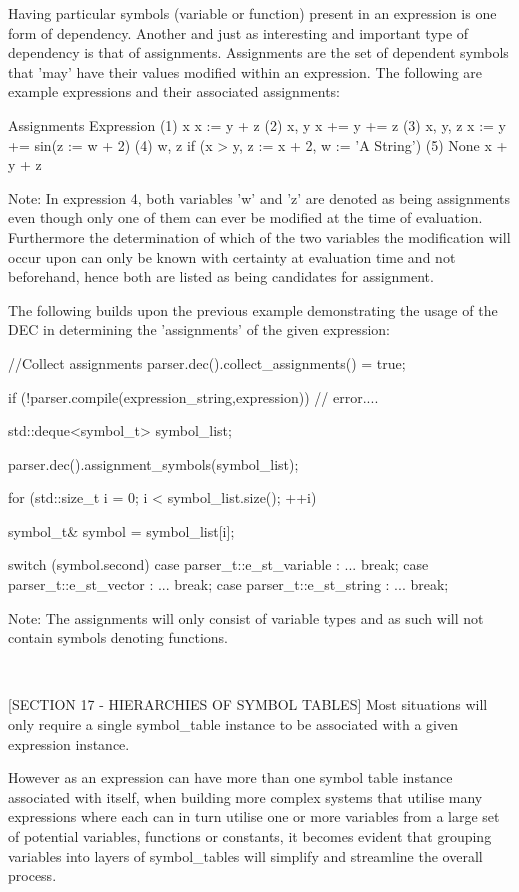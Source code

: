 Having  particular  symbols  (variable  or  function)  present  in  an
expression is one form of dependency. Another and just as  interesting
and important type of  dependency is that of  assignments. Assignments
are the set of dependent symbols that 'may' have their values modified
within an expression. The following are example expressions and  their
associated assignments:

Assignments   Expression
(1) x             x := y + z
(2) x, y          x += y += z
(3) x, y, z       x := y += sin(z := w + 2)
(4) w, z          if (x > y, z := x + 2, w := 'A String')
(5) None          x + y + z


Note: In expression 4, both variables 'w' and 'z' are denoted as being
assignments even though only one of  them can ever be modified at  the
time of evaluation. Furthermore the determination of which of the  two
variables the  modification will  occur upon  can only  be known  with
certainty at evaluation time and not beforehand, hence both are listed
as being candidates for assignment.

The following builds upon the previous example demonstrating the usage
of the DEC in determining the 'assignments' of the given expression:

//Collect assignments
parser.dec().collect\_assignments() = true;

if (!parser.compile(expression\_string,expression))
{
// error....
}

std::deque<symbol\_t> symbol\_list;

parser.dec().assignment\_symbols(symbol\_list);

for (std::size\_t i = 0; i < symbol\_list.size(); ++i)
{
symbol\_t\& symbol = symbol\_list[i];

switch (symbol.second)
{
	case parser\_t::e\_st\_variable : ... break;
	case parser\_t::e\_st\_vector   : ... break;
	case parser\_t::e\_st\_string   : ... break;
}
}


Note: The assignments will only consist of variable types and as  such
will not contain symbols denoting functions.

~~~~~~~~~~~~~~~~~~~~~~~~~~~~~~~~~~~~~~~~~~~~~~~~~~~~~~~~~~

[SECTION 17 - HIERARCHIES OF SYMBOL TABLES]
Most situations will only require a single symbol\_table instance to be
associated with a given expression instance.

However as an expression can have more than one symbol table  instance
associated  with  itself,  when  building  more  complex  systems that
utilise many expressions  where each can  in turn utilise  one or more
variables  from  a  large set  of  potential  variables, functions  or
constants, it becomes evident  that grouping variables into  layers of
symbol\_tables will simplify and streamline the overall process.

